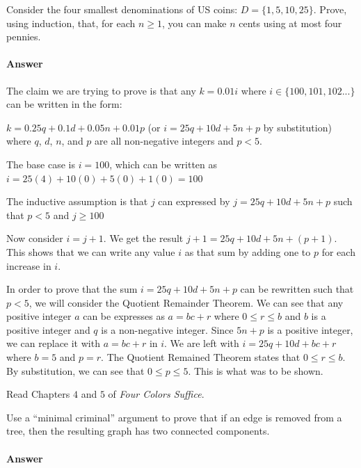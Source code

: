 \documentclass{article}
\begin{document}
Consider the four smallest denominations of US coins: $D=\{1,5,10,25\}$.  Prove, using
induction, that, for each $n \geq 1$, you can make $n$ cents using at most four
pennies.

\paragraph{Answer}
The claim we are trying to prove is that any $k = 0.01i$ where $i \in \{100, 101, 102...\}$ can be written in the form:

$k = 0.25q + 0.1d + 0.05n + 0.01p$ (or $i = 25q + 10d + 5n + p$ by substitution)
where $q$, $d$, $n$, and $p$ are all non-negative integers and $p<5$.

The base case is $i = 100$, which can be written as $i = 25(4) + 10(0) + 5(0) + 1(0) = 100$

The inductive assumption is that $j$ can expressed by $j = 25q + 10d + 5n + p$ such that $p<5$ and $j \geq 100$

Now consider $i=j+1$. We get the result $j+1 = 25q + 10d +5n + (p+1)$. This shows that we can write any value 
$i$ as that sum by adding one to $p$ for each increase in $i$.

In order to prove that the sum $i = 25q + 10d + 5n + p$ can be rewritten such that $p<5$, we will consider the Quotient Remainder Theorem.
We can see that any positive integer $a$ can be expresses as $a = bc + r$ where $0 \leq r \leq b$ and $b$ is a positive integer and $q$ is a non-negative integer.
Since $5n+p$ is a positive integer, we can replace it with $a=bc+r$ in $i$. We are left with  $i = 25q + 10d + bc+r$ where $b=5$ and $p=r$. 
The Quotient Remained Theorem states that $0 \leq r \leq b$. By substitution, we can see that $0 \leq p \leq 5$. This is what was to be shown.



 

Read Chapters $4$ and $5$ of \emph{Four Colors Suffice}.

Use a ``minimal criminal'' argument to prove that if an edge is removed from a
tree, then the resulting graph has two connected components.

        \paragraph{Answer}
\end{document}
